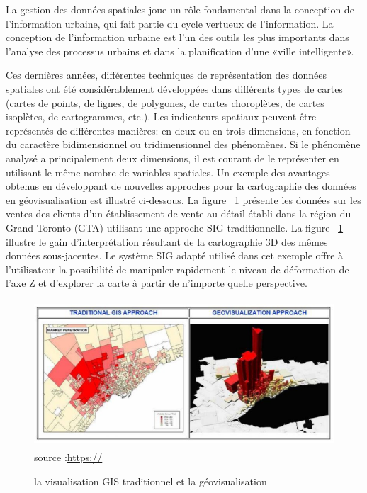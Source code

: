 \documentclass[french, a4paper, 12pt]{report}
\begin{document}
La gestion des données spatiales joue un rôle fondamental dans la conception de l’information urbaine, qui fait partie du cycle vertueux de l’information. La conception de l'information urbaine est l'un des outils les plus importants dans l'analyse des processus urbains et dans la planification d'une «ville intelligente».

Ces dernières années, différentes techniques de représentation des données spatiales ont été considérablement développées dans différents types de cartes (cartes de points, de lignes, de polygones, de cartes choroplètes, de cartes isoplètes, de cartogrammes, etc.). Les indicateurs spatiaux peuvent être représentés de différentes manières: en deux ou en trois dimensions, en fonction du caractère bidimensionnel ou tridimensionnel des phénomènes. Si le phénomène analysé a principalement deux dimensions, il est courant de le représenter en utilisant le même nombre de variables spatiales.
Un exemple des avantages obtenus en développant de nouvelles approches pour la cartographie des données en géovisualisation est illustré ci-dessous. La figure ~\ref{fig:1.12} présente les données sur les ventes des clients d'un établissement de vente au détail établi dans la région du Grand Toronto (GTA) utilisant une approche SIG traditionnelle. La figure ~\ref{fig:1.12} illustre le gain d'interprétation résultant de la cartographie 3D des mêmes données sous-jacentes. Le système SIG adapté utilisé dans cet exemple offre à l'utilisateur la possibilité de manipuler rapidement le niveau de déformation de l'axe Z et d'explorer la carte à partir de n'importe quelle perspective.
\begin{figure}[!ht]
    \centering
    \includegraphics[height=5.5cm]{images/geo1.jpg}
    \scriptsize{source :\url{https:// }}
    \caption{la visualisation GIS traditionnel et la géovisualisation }
    \label{fig:1.12}
\end{figure}

\end{document}
